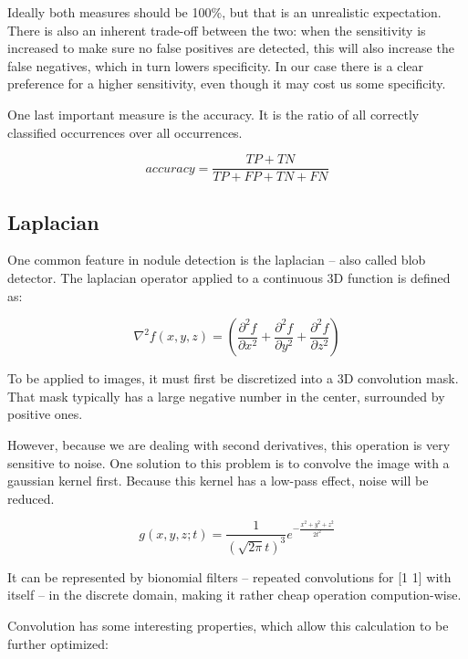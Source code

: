 \documentclass[titlepage, 10pt]{article}
\begin{document}
Ideally both measures should be 100\%, but that is an unrealistic expectation.
There is also an inherent trade-off between the two: when the sensitivity is
increased to make sure no false positives are detected, this will also increase
the false negatives, which in turn lowers specificity. In our case there is a
clear preference for a higher sensitivity, even though it may cost us some
specificity.

One last important measure is the accuracy. It is the ratio of all correctly
classified occurrences over all occurrences.

\begin{equation}
	accuracy = \frac{TP + TN}{TP + FP + TN + FN}
\end{equation}


\subsection{Laplacian}
One common feature in nodule detection is the laplacian -- also called blob
detector. The laplacian operator applied to a continuous 3D function is
defined as:

\begin{equation}
	\nabla^2f(x,y,z) = \left(\frac{\partial^2 f}{\partial x^2} + \frac{\partial^2
	f}{\partial y^2} + \frac{\partial^2 f}{\partial z^2}\right)
\end{equation}

To be applied to images, it must first be discretized into a 3D convolution
mask. That mask typically has a large negative number in the center, surrounded
by positive ones.

However, because we are dealing with second derivatives, this operation is very
sensitive to noise. One solution to this problem is to convolve the image with a
gaussian kernel first. Because this kernel has a low-pass effect, noise will be
reduced.

\begin{equation}
	g(x,y,z;t) = \frac{1}{(\sqrt{2\pi} t)^3}e^{-\frac{x^2+y^2+z^2}{2t^2}}
\end{equation}

It can be represented by bionomial filters -- repeated convolutions for [1 1]
with itself -- in the discrete domain, making it rather cheap operation
compution-wise.

Convolution has some interesting properties, which allow this calculation to be
further optimized:
\end{document}
